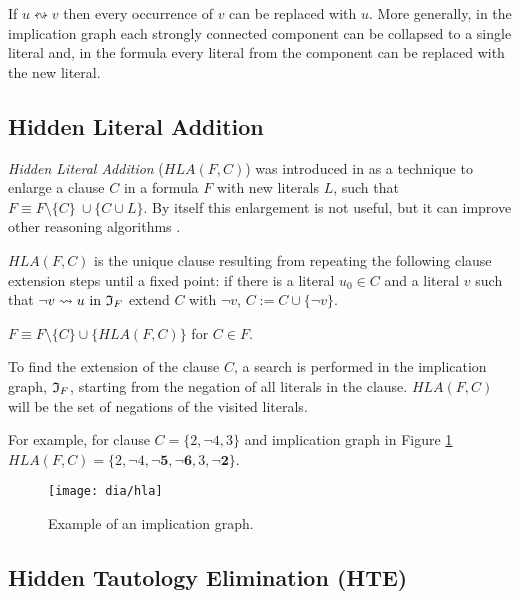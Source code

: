 \begin{myprop}
  If $u \leftrightsquigarrow v$ then every occurrence of $v$ can be replaced
  with $u$. More generally, in the implication graph each strongly
  connected component can be collapsed to a single literal and, in
  the formula every literal from the component can be replaced with
  the new literal.
\end{myprop}


\subsection{Hidden Literal Addition}
\label{ssec:hla}

\emph{Hidden Literal Addition} ($HLA(F, C)$) was introduced in
\cite{mine:hjb_efficient} as a technique to enlarge a clause $C$
in a formula $F$ with new literals $L$, such that $F \equiv F \setminus \{C\} \
\cup \{ C \cup L \}$. By itself this enlargement is not useful, but it
can improve other reasoning algorithms \cite{Heule:2010:CEP:1928380.1928406, Heule_coveredclause}.

\begin{mydef}
  $HLA(F, C)$ is the unique clause resulting from repeating the following
  clause extension steps until a fixed point: if there is a literal $u_0 \in C$
  and a literal $v$ such that $\neg v \rightsquigarrow u \text{ in } \mathfrak{I}_F$
  extend $C$ with $\neg v$, $C := C \cup \{ \neg v \}$.
\end{mydef}

\begin{myprop}
  $F \equiv F \setminus \{C\} \cup \{HLA(F, C)\}$ for $C \in F$.
\end{myprop}

To find the extension of the clause $C$, a search is performed in
the implication graph, $\mathfrak{I}_F$, starting from the negation of all
literals in the clause. $HLA(F, C)$ will be the set of negations
of the visited literals.

For example, for clause $C = \{ 2, \neg 4, 3\}$
and implication graph in Figure \ref{fig:hla}
$HLA(F, C) = \{2, \neg 4, \mathbf{\neg 5, \neg 6}, 3, \mathbf{\neg 2} \}$.

\begin{figure}
  \centering
  \texttt{[image: dia/hla]}
  \caption{Example of an implication graph.}
  \label{fig:hla}
\end{figure}


\subsection{Hidden Tautology Elimination (HTE)}
\label{ssec:hte}

